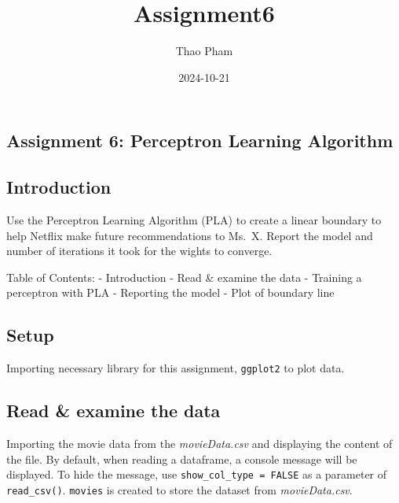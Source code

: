 \documentclass[
]{article}
\title{Assignment6}
\author{Thao Pham}
\date{2024-10-21}
\newenvironment{Shaded}{\begin{snugshade}}{\end{snugshade}}
\newcommand{\AttributeTok}[1]{\textcolor[rgb]{0.13,0.29,0.53}{#1}}
\newcommand{\ConstantTok}[1]{\textcolor[rgb]{0.56,0.35,0.01}{#1}}
\newcommand{\FunctionTok}[1]{\textcolor[rgb]{0.13,0.29,0.53}{\textbf{#1}}}
\newcommand{\NormalTok}[1]{#1}
\newcommand{\SpecialCharTok}[1]{\textcolor[rgb]{0.81,0.36,0.00}{\textbf{#1}}}
\begin{document}
\maketitle

\subsection{Assignment 6: Perceptron Learning
Algorithm}\label{assignment-6-perceptron-learning-algorithm}

\subsection{Introduction}\label{introduction}

Use the Perceptron Learning Algorithm (PLA) to create a linear boundary
to help Netflix make future recommendations to Ms.~X. Report the model
and number of iterations it took for the wights to converge.

Table of Contents: - Introduction - Read \& examine the data - Training
a perceptron with PLA - Reporting the model - Plot of boundary line

\subsection{Setup}\label{setup}

Importing necessary library for this assignment, \texttt{ggplot2} to
plot data.

\begin{Shaded}
\end{Shaded}

\subsection{Read \& examine the data}\label{read-examine-the-data}

Importing the movie data from the \emph{movieData.csv} and displaying
the content of the file. By default, when reading a dataframe, a console
message will be displayed. To hide the message, use
\texttt{show\_col\_type\ =\ FALSE} as a parameter of
\texttt{read\_csv()}. \texttt{movies} is created to store the dataset
from \emph{movieData.csv}.
\end{document}
